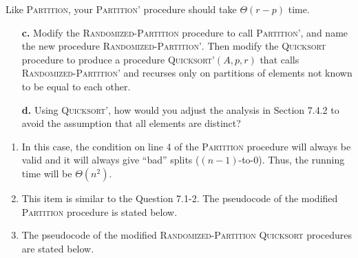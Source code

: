 \begin{enumerate}
{\begin{enumerate}
{Like \textsc{Partition}, your \textsc{Partition'} procedure should take
$\Theta(r - p)$ time.
}
\end{enumerate}

\begin{enumerate}
\item[\textbf{c.}]{Modify the \textsc{Randomized-Partition} procedure to call
\textsc{Partition'}, and name the new procedure \textsc{Randomized-Partition'}.
Then modify the \textsc{Quicksort} procedure to produce a procedure
\textsc{Quicksort'}$(A, p, r)$ that calls \textsc{Randomized-Partition'} and
recurses only on partitions of elements not known to be equal to each other.}

\item[\textbf{d.}]{Using \textsc{Quicksort'}, how would you adjust the analysis
in Section 7.4.2 to avoid the assumption that all elements are distinct?}
\end{enumerate}
}

\begin{framed}
\begin{enumerate}
\item{In this case, the condition on line 4 of the \textsc{Partition} procedure
will always be valid and it will always give ``bad'' splits
($(n - 1)$-to-0). Thus, the running time will be $\Theta(n^2)$.}
\item{This item is similar to the Question 7.1-2. The pseudocode of the modified
\textsc{Partition} procedure is stated below.

\begin{algorithm}[H]
\SetAlgoNoEnd\DontPrintSemicolon
\BlankLine
{}
\nonl{}
\end{algorithm}
}
\item{The pseudocode of the modified \textsc{Randomized-Partition}
\textsc{Quicksort} procedures are stated below.

\begin{algorithm}[H]
\SetAlgoNoEnd\DontPrintSemicolon
\BlankLine
{}
\nonl{}
\end{algorithm}

}
\end{enumerate}
\end{framed}
\end{enumerate}

